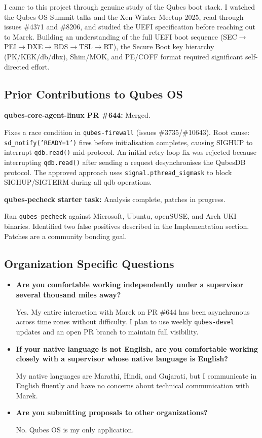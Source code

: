 \documentclass[12pt, a4paper]{article}
\begin{document}
I came to this project through genuine study of the Qubes boot stack. I watched the Qubes OS Summit talks and the Xen Winter Meetup 2025, read through issues \#4371 and \#8206, and studied the UEFI specification before reaching out to Marek. Building an understanding of the full UEFI boot sequence (SEC$\to$PEI$\to$DXE$\to$BDS$\to$TSL$\to$RT), the Secure Boot key hierarchy (PK/KEK/db/dbx), Shim/MOK, and PE/COFF format required significant self-directed effort.

\subsection*{Prior Contributions to Qubes OS}

\textbf{qubes-core-agent-linux PR \#644:} Merged.

Fixes a race condition in \texttt{qubes-firewall} (issues \#3735/\#10643). Root cause: \texttt{sd\_notify('READY=1')} fires before initialisation completes, causing SIGHUP to interrupt \texttt{qdb.read()} mid-protocol. An initial retry-loop fix was rejected because interrupting \texttt{qdb.read()} after sending a request desynchronises the QubesDB protocol. The approved approach uses \texttt{signal.pthread\_sigmask} to block SIGHUP/SIGTERM during all qdb operations.

\textbf{qubes-pecheck starter task:} Analysis complete, patches in progress.

Ran \texttt{qubes-pecheck} against Microsoft, Ubuntu, openSUSE, and Arch UKI binaries. Identified two false positives described in the Implementation section. Patches are a community bonding goal.

\subsection*{Organization Specific Questions}

\begin{itemize}
    \item \textbf{Are you comfortable working independently under a supervisor several thousand miles away?}

    Yes. My entire interaction with Marek on PR \#644 has been asynchronous across time zones without difficulty. I plan to use weekly \texttt{qubes-devel} updates and an open PR branch to maintain full visibility.

    \item \textbf{If your native language is not English, are you comfortable working closely with a supervisor whose native language is English?}

    My native languages are Marathi, Hindi, and Gujarati, but I communicate in English fluently and have no concerns about technical communication with Marek.

    \item \textbf{Are you submitting proposals to other organizations?}

    No. Qubes OS is my only application.
\end{itemize}
\end{document}
